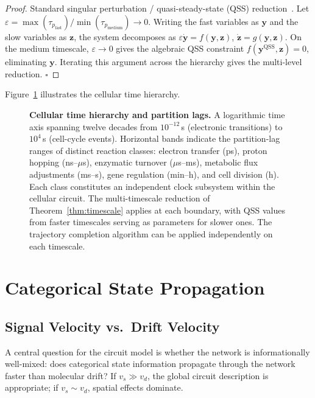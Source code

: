 \documentclass[twocolumn,10pt,a4paper]{article}
\newcommand{\taup}{\tau_p}
\begin{document}
\begin{proof}
Standard singular perturbation / quasi-steady-state (QSS) reduction~\cite{Murray2002}.
Let $\varepsilon=\max(\taup_{\mathrm{fast}})/\min(\taup_{\mathrm{medium}})\to 0$.
Writing the fast variables as $\mathbf{y}$ and the slow variables as
$\mathbf{z}$, the system decomposes as $\varepsilon\dot{\mathbf{y}}=
f(\mathbf{y},\mathbf{z})$, $\dot{\mathbf{z}}=g(\mathbf{y},\mathbf{z})$.
On the medium timescale, $\varepsilon\to 0$ gives the algebraic QSS constraint
$f(\mathbf{y}^{\mathrm{QSS}},\mathbf{z})=0$, eliminating $\mathbf{y}$.
Iterating this argument across the hierarchy gives the multi-level reduction.
$\square$
\end{proof}

Figure~\ref{fig:timescales} illustrates the cellular time hierarchy.

\begin{figure}[t]
\centering
\fbox{\rule{0pt}{4cm}\rule{15cm}{0pt}}
\caption{\textbf{Cellular time hierarchy and partition lags.}  A logarithmic
time axis spanning twelve decades from $10^{-12}$\,s (electronic transitions)
to $10^4$\,s (cell-cycle events).  Horizontal bands indicate the partition-lag
ranges of distinct reaction classes: electron transfer (ps), proton hopping
(ns--$\mu$s), enzymatic turnover ($\mu$s--ms), metabolic flux adjustments
(ms--s), gene regulation (min--h), and cell division (h).  Each class
constitutes an independent clock subsystem within the cellular circuit.  The
multi-timescale reduction of Theorem~\ref{thm:timescale} applies at each
boundary, with QSS values from faster timescales serving as parameters for
slower ones.  The trajectory completion algorithm can be applied independently
on each timescale.}
\label{fig:timescales}
\end{figure}

\section{Categorical State Propagation}
\label{sec:propagation}

\subsection{Signal Velocity vs.\ Drift Velocity}
\label{sec:prop-velocity}

A central question for the circuit model is whether the network is
informationally well-mixed: does categorical state information propagate
through the network faster than molecular drift?  If $v_s\gg v_d$, the global
circuit description is appropriate; if $v_s\sim v_d$, spatial effects dominate.
\end{document}
